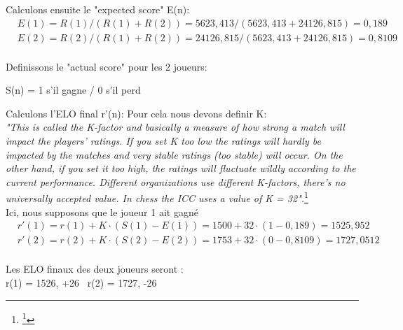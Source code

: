     Calculons ensuite le "expected score" E(n):
    \begin{equation}
        \begin{split}
            & E(1) = R(1) / ( R(1) + R(2)) = 5623,413 / (5623,413 + 24126,815) = 0,189 \\
            & E(2) = R(2) / ( R(1) + R(2)) = 24126,815 / (5623,413 + 24126,815) = 0,8109 \\
        \end{split}
    \end{equation}

    Definissons le "actual score" pour les 2 joueurs:
    \begin{center}
        S(n) = 1 s'il gagne / 0 s'il perd
    \end{center}
    
    Calculons l'ELO final r'(n):
    Pour cela nous devons definir K: \\
    \textit{"This is called the K-factor and basically a measure of how strong a match will impact the players’ ratings.
    If you set K too low the ratings will hardly be impacted by the matches and very stable ratings (too stable) will occur.
    On the other hand, if you set it too high, the ratings will fluctuate wildly according to the current performance.
     Different organizations use different K-factors, there’s no universally accepted value. In chess the ICC uses a value of K = 32".}\footnote{\footnote{\href{https://metinmediamath.wordpress.com/2013/11/27/how-to-calculate-the-elo-rating-including-example/}{Metin's Media and Math, How To Calculate the Elo-Rating }}} \\
    Ici, nous supposons que le joueur 1 ait gagné
    \begin{equation}
        \begin{split}
           & r'(1) = r(1) + K \cdot (S(1) - E(1)) = 1500 + 32 \cdot (1 - 0,189) = 1525,952 \\
           & r'(2) = r(2) + K \cdot (S(2) - E(2)) = 1753 + 32 \cdot (0-0,8109) = 1727,0512 \\
        \end{split}
    \end{equation}

    Les ELO finaux des deux joueurs seront : \\

        r(1) = 1526, +26 \ r(2) = 1727, -26
    

